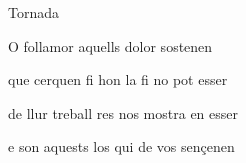 \documentclass[12pt]{article}
\begin{document}
\begin{estrofaExtra}%




\begin{tornada}

Tornada

\end{tornada}


\end{estrofaExtra}


\begin{estrofa}

 O follamor aquells dolor sostenen

 que cerquen fi hon la fi no pot esser

 de llur treball res nos mostra en esser

 e son aquests los qui de vos sen\c{c}enen

\end{estrofa}
\end{document}
